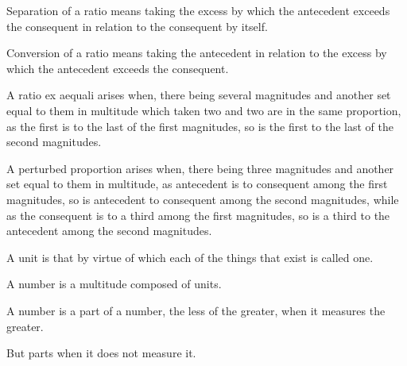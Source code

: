 \documentclass{rrxiv}
\begin{document}
\begin{scope}
\label{def:V.15}
Separation of a ratio means taking the excess by which the antecedent
exceeds the consequent in relation to the consequent by itself.
\end{scope}

\begin{scope}
\label{def:V.16}
Conversion of a ratio means taking the antecedent in relation to the
excess by which the antecedent exceeds the consequent.
\end{scope}

\begin{scope}
\label{def:V.17}
A ratio ex aequali arises when, there being several magnitudes and
another set equal to them in multitude which taken two and two are
in the same proportion, as the first is to the last of the first
magnitudes, so is the first to the last of the second magnitudes.
\end{scope}

\begin{scope}
\label{def:V.18}
A perturbed proportion arises when, there being three magnitudes and
another set equal to them in multitude, as antecedent is to consequent
among the first magnitudes, so is antecedent to consequent among the
second magnitudes, while as the consequent is to a third among the
first magnitudes, so is a third to the antecedent among the second
magnitudes.
\end{scope}


\begin{scope}
\label{def:VII.1}
A unit is that by virtue of which each of the things that exist is
called one.
\end{scope}

\begin{scope}
\label{def:VII.2}
A number is a multitude composed of units.
\end{scope}

\begin{scope}
\label{def:VII.3}
A number is a part of a number, the less of the greater, when it
measures the greater.
\end{scope}

\begin{scope}
\label{def:VII.4}
But parts when it does not measure it.
\end{scope}
\end{document}
